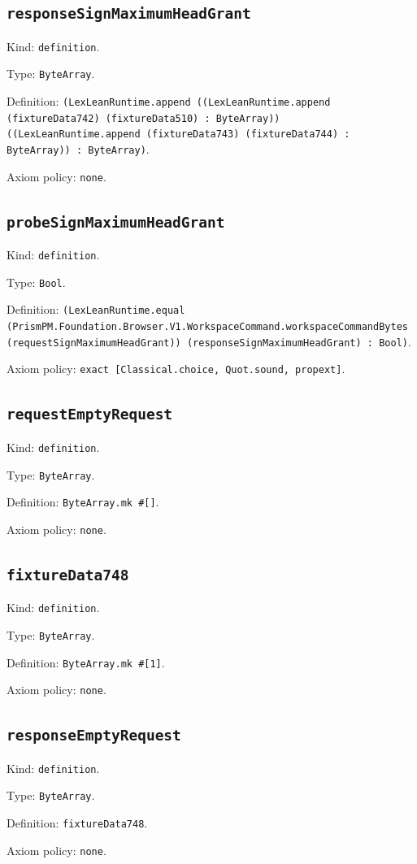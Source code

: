 \documentclass[11pt]{article}
\begin{document}
\subsection*{\texttt{responseSignMaximumHeadGrant}}
\noindent Kind: \texttt{definition}.\par
\noindent Type: \texttt{ByteArray}.\par
\noindent Definition: \texttt{(LexLeanRuntime.append ((LexLeanRuntime.append (fixtureData742) (fixtureData510) : ByteArray)) ((LexLeanRuntime.append (fixtureData743) (fixtureData744) : ByteArray)) : ByteArray)}.\par
\noindent Axiom policy: \texttt{none}.\par
\subsection*{\texttt{probeSignMaximumHeadGrant}}
\noindent Kind: \texttt{definition}.\par
\noindent Type: \texttt{Bool}.\par
\noindent Definition: \texttt{(LexLeanRuntime.equal (PrismPM.Foundation.Browser.V1.WorkspaceCommand.workspaceCommandBytes (requestSignMaximumHeadGrant)) (responseSignMaximumHeadGrant) : Bool)}.\par
\noindent Axiom policy: \texttt{exact [Classical.choice, Quot.sound, propext]}.\par
\subsection*{\texttt{requestEmptyRequest}}
\noindent Kind: \texttt{definition}.\par
\noindent Type: \texttt{ByteArray}.\par
\noindent Definition: \texttt{ByteArray.mk \#[]}.\par
\noindent Axiom policy: \texttt{none}.\par
\subsection*{\texttt{fixtureData748}}
\noindent Kind: \texttt{definition}.\par
\noindent Type: \texttt{ByteArray}.\par
\noindent Definition: \texttt{ByteArray.mk \#[1]}.\par
\noindent Axiom policy: \texttt{none}.\par
\subsection*{\texttt{responseEmptyRequest}}
\noindent Kind: \texttt{definition}.\par
\noindent Type: \texttt{ByteArray}.\par
\noindent Definition: \texttt{fixtureData748}.\par
\noindent Axiom policy: \texttt{none}.\par
\end{document}
